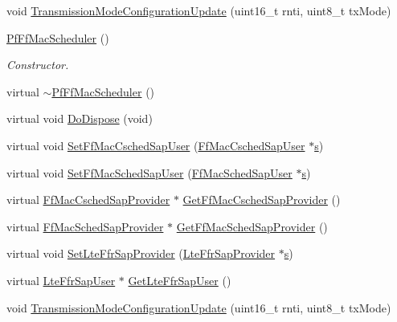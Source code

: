 \begin{DoxyCompactItemize}
\item 
void \hyperlink{classns3_1_1PfFfMacScheduler_a1f5050d19fecb18a52f429ae7ec14964}{Transmission\+Mode\+Configuration\+Update} (uint16\+\_\+t rnti, uint8\+\_\+t tx\+Mode)
\item 
\hyperlink{classns3_1_1PfFfMacScheduler_ad972377fd4997d9bf0b8193e69f20a16}{Pf\+Ff\+Mac\+Scheduler} ()
\begin{DoxyCompactList}\small\item\em Constructor. \end{DoxyCompactList}\item 
virtual \hyperlink{classns3_1_1PfFfMacScheduler_aa25efcda60eeeb32487ee4fbff5cf0b4}{$\sim$\+Pf\+Ff\+Mac\+Scheduler} ()
\item 
virtual void \hyperlink{classns3_1_1PfFfMacScheduler_ab77ff38d8dedac8bd5c87142429cdf8d}{Do\+Dispose} (void)
\item 
virtual void \hyperlink{classns3_1_1PfFfMacScheduler_ab229f1aa309ec79607ac0d3797d842ff}{Set\+Ff\+Mac\+Csched\+Sap\+User} (\hyperlink{classns3_1_1FfMacCschedSapUser}{Ff\+Mac\+Csched\+Sap\+User} $\ast$\hyperlink{generate__test__data__lte__sinr_8m_ad83eeb3a142285d1243a08c6b7026df8}{s})
\item 
virtual void \hyperlink{classns3_1_1PfFfMacScheduler_a6e7053dd95a82c17010442cc20e3879f}{Set\+Ff\+Mac\+Sched\+Sap\+User} (\hyperlink{classns3_1_1FfMacSchedSapUser}{Ff\+Mac\+Sched\+Sap\+User} $\ast$\hyperlink{generate__test__data__lte__sinr_8m_ad83eeb3a142285d1243a08c6b7026df8}{s})
\item 
virtual \hyperlink{classns3_1_1FfMacCschedSapProvider}{Ff\+Mac\+Csched\+Sap\+Provider} $\ast$ \hyperlink{classns3_1_1PfFfMacScheduler_a7ff8ac4c9fede4ff56ac1cc69072bfd2}{Get\+Ff\+Mac\+Csched\+Sap\+Provider} ()
\item 
virtual \hyperlink{classns3_1_1FfMacSchedSapProvider}{Ff\+Mac\+Sched\+Sap\+Provider} $\ast$ \hyperlink{classns3_1_1PfFfMacScheduler_a62b59c7a3df5edd4e12d4c1798bd7f9f}{Get\+Ff\+Mac\+Sched\+Sap\+Provider} ()
\item 
virtual void \hyperlink{classns3_1_1PfFfMacScheduler_ac871ac9e42f185a234071e9bbaa6a243}{Set\+Lte\+Ffr\+Sap\+Provider} (\hyperlink{classns3_1_1LteFfrSapProvider}{Lte\+Ffr\+Sap\+Provider} $\ast$\hyperlink{generate__test__data__lte__sinr_8m_ad83eeb3a142285d1243a08c6b7026df8}{s})
\item 
virtual \hyperlink{classns3_1_1LteFfrSapUser}{Lte\+Ffr\+Sap\+User} $\ast$ \hyperlink{classns3_1_1PfFfMacScheduler_a63dbbbc0299a19b252237705779b9e41}{Get\+Lte\+Ffr\+Sap\+User} ()
\item 
void \hyperlink{classns3_1_1PfFfMacScheduler_a1f5050d19fecb18a52f429ae7ec14964}{Transmission\+Mode\+Configuration\+Update} (uint16\+\_\+t rnti, uint8\+\_\+t tx\+Mode)
\end{DoxyCompactItemize}
